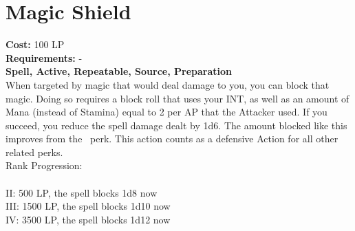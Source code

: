 \section{Magic Shield}\label{spell:magicShield}
\textbf{Cost:} 100 LP\\
\textbf{Requirements:} -\\
\textbf{Spell, Active, Repeatable, Source, Preparation}\\
When targeted by magic that would deal damage to you, you can block that magic.
Doing so requires a block roll that uses your INT, as well as an amount of Mana (instead of Stamina) equal to 2 per AP that the Attacker used.
If you succeed, you reduce the spell damage dealt by 1d6.
The amount blocked like this improves from the~ perk.
This action counts as a defensive Action for all other related perks.
\\
Rank Progression:\\
\\
II: 500 LP, the spell blocks 1d8 now\\
III: 1500 LP, the spell blocks 1d10 now\\
IV: 3500 LP, the spell blocks 1d12 now\\